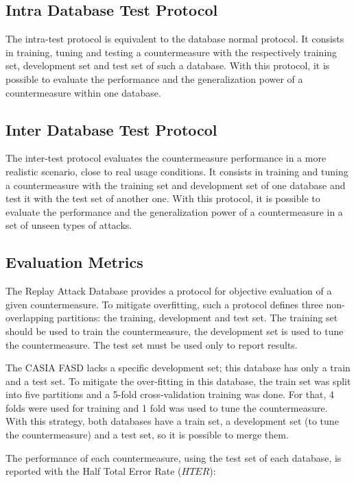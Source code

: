 \subsection{Intra Database Test Protocol}

The intra-test protocol is equivalent to the database normal protocol. It consists in training, tuning and testing a countermeasure with the respectively training set, development set and test set of such a database. With this protocol, it is possible to evaluate the performance and the generalization power of a countermeasure within one database. 

\subsection{Inter Database Test Protocol}

The inter-test protocol evaluates the countermeasure performance in a more realistic scenario, close to real usage conditions. It consists in training and tuning a countermeasure with the training set and development set of one database and test it with the test set of another one. With this protocol, it is possible to evaluate the performance and the generalization power of a countermeasure in a set of unseen types of attacks.


\subsection{Evaluation Metrics}

The Replay Attack Database provides a protocol for objective evaluation of a given countermeasure. To mitigate overfitting, such a protocol defines three non-overlapping partitions: the training, development and test set. The training set should be used to train the countermeasure, the development set is used to tune the countermeasure. The test set must be used only to report results. 

The CASIA FASD lacks a specific development set; this database has only a train and a test set. To mitigate the over-fitting in this database, the train set was split into five partitions and a 5-fold cross-validation training was done. For that, 4 folds were used for training and 1 fold was used to tune the countermeasure. With this strategy, both databases have a train set, a development set (to tune the countermeasure) and a test set, so it is possible to merge them.

The performance of each countermeasure, using the test set of each database, is reported with the Half Total Error Rate ($HTER$): 

